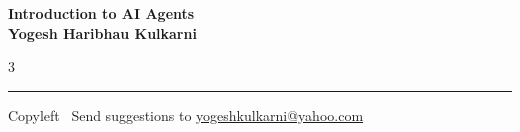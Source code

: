 \documentclass[8pt,landscape]{article}
\begin{document}
\footnotesize


\begin{center}
\Large{\textbf{Introduction to AI Agents\\ Yogesh Haribhau Kulkarni}}
\end{center}

\begin{multicols}{3}

\end{multicols}

\rule{\linewidth}{0.25pt}
\scriptsize
Copyleft \textcopyleft\  Send suggestions to
\href{http://www.yogeshkulkarni.com}{yogeshkulkarni@yahoo.com}
\end{document}
